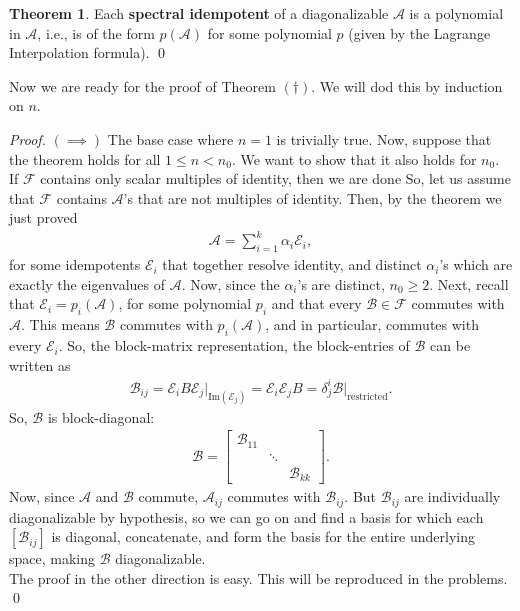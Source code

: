 \documentclass{article}
\theoremstyle{definition}
\newtheorem{thm}{Theorem}[section]
\newcommand{\F}{\mathcal{F}}
\newcommand{\A}{\mathcal{A}}
\newcommand{\B}{\mathcal{B}}
\newcommand{\E}{\mathcal{E}}
\newcommand{\ima}{\text{Im}}
\begin{document}
\begin{thm}
	Each \textbf{spectral idempotent} of a diagonalizable $\A$ is a polynomial in $\A$, i.e., is of the form $p(\A)$ for some polynomial $p$ (given by the Lagrange Interpolation formula). \qed
\end{thm}

Now we are ready for the proof of Theorem $(\dagger)$. We will dod this by induction on $n$. 
\begin{proof}
	$(\implies)$ The base case where $n=1$ is trivially true. Now, suppose that the theorem holds for all $1\leq n < n_0$. We want to show that it also holds for $n_0$. If $\F$ contains only scalar multiples of identity, then we are done So, let us assume that $\F$ contains $\A$'s that are not multiples of identity. Then, by the theorem we just proved
	\begin{align*}
	\A = \sum^k_{i=1}\alpha_i\E_i,
	\end{align*}
	for some idempotents $\E_i$ that together resolve identity, and distinct $\alpha_i$'s which are exactly the eigenvalues of $\A$. Now, since the $\alpha_i$'s are distinct, $n_0 \geq 2$. Next, recall that $\E_i = p_i(\A)$, for some polynomial $p_i$ and that every $\B \in \F$ commutes with $\A$. This means $\B$ commutes with $p_i(\A)$, and in particular, commutes with every $\E_i$. So, the block-matrix representation, the block-entries of $\B$ can be written as
	\begin{align*}
	\B_{ij} = \E_i B \E_j\bigg\vert_{\ima(\E_j)} = \E_i \E_j B = \delta^i_j\B\bigg\vert_{\text{restricted}}.
	\end{align*}
	So, $\B$ is block-diagonal:
	\begin{align*}
	\B = \begin{bmatrix}
	\B_{11} & & \\
	& \ddots &\\
	& & \B_{kk} 
	\end{bmatrix}.
	\end{align*}
	Now, since $\A$ and $\B$ commute, $\A_{ij}$ commutes with $\B_{ij}$. But $\B_{ij}$ are individually diagonalizable by hypothesis, so we can go on and find a basis for which each $[\B_{ij}]$ is diagonal, concatenate, and form the basis for the entire underlying space, making $\B$ diagonalizable. \\
	
	The proof in the other direction is easy. This will be reproduced in the problems. \qed
\end{proof}
\end{document}
